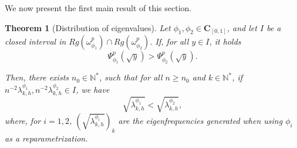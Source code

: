 \documentclass[11pt]{article}
\newtheorem{theorem}{Theorem}[section]
\begin{document}
We now present the first main result of this section.
\begin{theorem}[Distribution of eigenvalues]\label{tdis1}
Let $\phi_1, \phi_2 \in \mathbf{C}_{[0,1]}$, and let $I$ be a closed interval in  $Rg(\omega_{\phi_1}^p) \cap Rg(\omega_{\phi_2}^p)$. If, for all $y \in I$, it holds
\begin{equation}\label{hypoonordeing}
  \Psi_{\phi_1}^{p}(\sqrt{y})>\Psi_{\phi_2}^{p}(\sqrt{y}). 
\end{equation}

Then, there exists $  n_0\in\mathbb{N}^{*}$,  such that for all $n\geq n_0$  and $k\in \mathbb{N}^{*}$, if \\$n^{-2}\lambda_{k,h}^{\phi_1},n^{-2}\lambda_{k,h}^{\phi_2}\in I$, we have 
$$ 
\sqrt{\lambda_{k,h}^{\phi_1}}<\sqrt{\lambda_{k,h}^{\phi_2}},
$$ 
where, for $i=1,2$, $\left(\sqrt{\lambda_{k,h}^{\phi_i}}\right)_k$ are the eigenfrequencies generated when using $\phi_i$ as a reparametrization.
\end{theorem}
\end{document}
